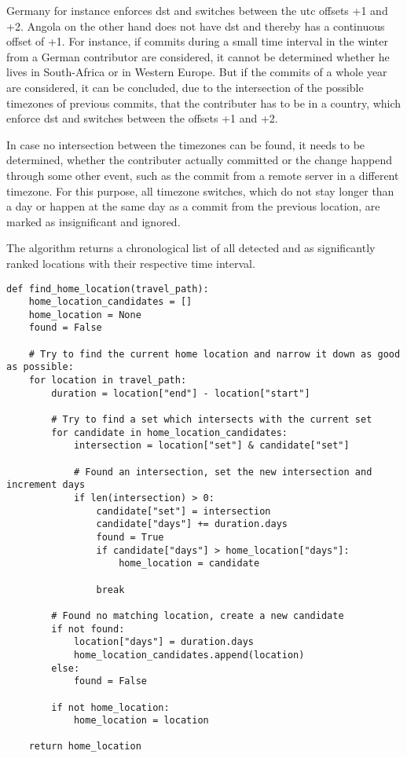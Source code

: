 Germany for instance enforces \ac{dst} and switches between the \ac{utc} offsets +1 and +2. Angola on the other hand does not have \ac{dst} and thereby has a continuous offset of +1.
For instance, if commits during a small time interval in the winter from a German contributor are considered, it cannot be determined whether he lives in South-Africa or in Western Europe.
But if the commits of a whole year are considered, it can be concluded, due to the intersection of the possible timezones of previous commits, that the contributer has to be in a country, which enforce \ac{dst} and switches between the offsets +1 and +2.

In case no intersection between the timezones can be found, it needs to be determined, whether the contributer actually committed or the change happend through some other event, such as the commit from a remote server in a different timezone.
For this purpose, all timezone switches, which do not stay longer than a day or happen at the same day as a commit from the previous location, are marked as insignificant and ignored.

The algorithm returns a chronological list of all detected and as significantly ranked locations with their respective time interval.


\begin{verbatim}
def find_home_location(travel_path):
    home_location_candidates = []
    home_location = None
    found = False

    # Try to find the current home location and narrow it down as good as possible:
    for location in travel_path:
        duration = location["end"] - location["start"]

        # Try to find a set which intersects with the current set
        for candidate in home_location_candidates:
            intersection = location["set"] & candidate["set"]

            # Found an intersection, set the new intersection and increment days
            if len(intersection) > 0:
                candidate["set"] = intersection
                candidate["days"] += duration.days
                found = True
                if candidate["days"] > home_location["days"]:
                    home_location = candidate

                break

        # Found no matching location, create a new candidate
        if not found:
            location["days"] = duration.days
            home_location_candidates.append(location)
        else:
            found = False

        if not home_location:
            home_location = location

    return home_location
\end{verbatim}
\begingroup
{}\label{lst:home-location-analysis}
\endgroup


